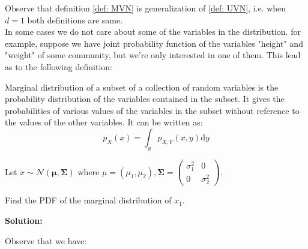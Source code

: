 {Observe that definition \ref{def: MVN} is generalization of \ref{def: UVN}, i.e. when $d = 1$ both definitions are same.
\\

In some cases we do not care about some of the variables in the distribution. for example, suppose we have joint probability function of the variables "height" and "weight" of some community, but we're only interested in one of them. This lead as to the following definition:

\begin{definition}
Marginal distribution of a subset of a collection of random variables is the probability distribution of the variables contained in the subset. It gives the probabilities of various values of the variables in the subset without reference to the values of the other variables. It can be written as:
$$p_{X}(x)=\int_{y}p_{X,Y}(x,y)\mathrm{d}y$$
\end{definition}

\begin{exercise}
Let $x\sim\mathcal{N}(\boldsymbol{\mu},\boldsymbol{\Sigma})$ where $\mu = (\mu_1, \mu_2), \boldsymbol{\Sigma}=\left(\begin{array}{cc}
\sigma_{1}^{2} & 0\\
0 & \sigma_{2}^{2}
\end{array}\right)$.

Find the PDF of the marginal distribution of $x_1$.
\end{exercise}
\noindent
\textbf{Solution:}

Observe that we have:

}

